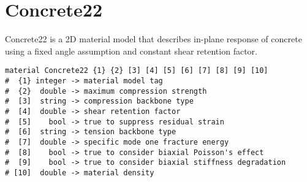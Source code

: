 \documentclass[11pt]{article}
\begin{document}
\section{Concrete22}
Concrete22 is a 2D material model that describes in-plane response of concrete using a fixed angle assumption and constant shear retention factor.
\begin{lstlisting}
material Concrete22 {1} {2} [3] [4] [5] [6] [7] [8] [9] [10]
#  {1} integer -> material model tag
#  {2}  double -> maximum compression strength
#  [3]  string -> compression backbone type
#  [4]  double -> shear retention factor
#  [5]    bool -> true to suppress residual strain
#  [6]  string -> tension backbone type
#  [7]  double -> specific mode one fracture energy
#  [8]    bool -> true to consider biaxial Poisson's effect
#  [9]    bool -> true to consider biaxial stiffness degradation
# [10]  double -> material density
\end{lstlisting}

\end{document}
